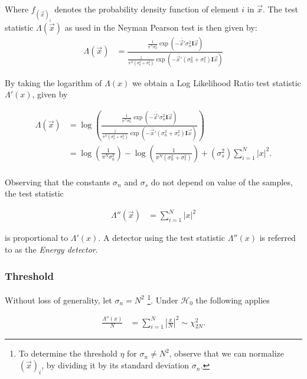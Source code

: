 \documentclass[a4paper, openany, oneside]{memoir}
\begin{document}
Where $f_{(\vec{x})_i}$ denotes the probability density function of element $i$ in $\vec{x}$.  The test statistic $\Lambda(\vec{x})$ as used in the Neyman Pearson test is then given by:
\begin{align*}
\Lambda(\vec{x}) &=\frac{\frac{1}{\pi^N \sigma_n^2} \exp(-\bar{\vec{x}}'\sigma_n^2\mathbf{I}\vec{x})}{\frac{1}{\pi^N (\sigma_n^2 + \sigma_s^2)} \exp(-\bar{\vec{x}}'(\sigma_n^2+\sigma_s^2)\mathbf{I}\vec{x})}
\end{align*}


By taking the logarithm of $\Lambda(x)$ we obtain a Log Likelihood Ratio test statistic $\Lambda'(x)$, given by

\begin{align*}
\Lambda(\vec{x}) &= \log(\frac{\frac{1}{\pi^N \sigma_n^2} \exp(-\bar{\vec{x}}'\sigma_n^2\mathbf{I}\vec{x})}{\frac{1}{\pi^N (\sigma_n^2 + \sigma_s^2)} \exp(-\bar{\vec{x}}'(\sigma_n^2+\sigma_s^2)\mathbf{I}\vec{x})}) \\
&= \log(\frac{1}{\pi^N \sigma_n^2}) - \log(\frac{1}{\pi^N (\sigma_n^2 + \sigma_s^2)}) +  (\sigma_s^2) \sum_{i=1}^N |x|^2. \\
\end{align*}

Observing that the constants $\sigma_n$ and $\sigma_s$ do not depend on value of the samples, the test statistic 

\begin{align*}
\Lambda''(\vec{x}) &= \sum_{i=1}^N |x|^2
\end{align*} 

is proportional to $\Lambda'(x)$. A detector using the test statistic $\Lambda''(x)$ is  referred to as the \emph{Energy detector}. 

\subsubsection{Threshold}

Without loss of generality, let $\sigma_n = N^2$ \footnote{To determine the threshold $\eta$ for $\sigma_n \neq N^2$, observe that we can normalize $(\vec{x})_i$, by dividing it by its standard deviation $\sigma_n$.}. Under $\mathcal{H}_0$ the following applies\cite{teguigspectrum2014}  

\begin{align}
    \frac{\Lambda''(x)}{N} &= \sum_{i=1}^N \left|\frac{x}{N}\right|^2 \sim \chi^2_{2N}.
\end{align}

\end{document}
